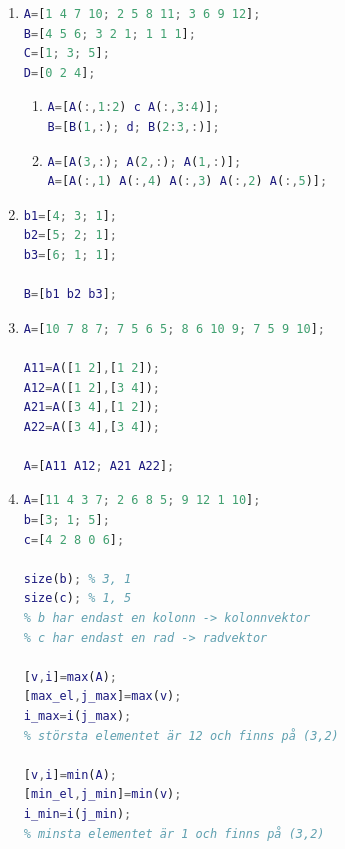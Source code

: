 \documentclass{article}
\begin{document}
\begin{enumerate}

\item
\begin{lstlisting}[language=matlab]
A=[1 4 7 10; 2 5 8 11; 3 6 9 12];
B=[4 5 6; 3 2 1; 1 1 1];
C=[1; 3; 5];
D=[0 2 4];
\end{lstlisting}

\begin{enumerate}

\item
\begin{lstlisting}[language=matlab]
A=[A(:,1:2) c A(:,3:4)];
B=[B(1,:); d; B(2:3,:)];
\end{lstlisting}

\item
\begin{lstlisting}[language=matlab]
A=[A(3,:); A(2,:); A(1,:)];
A=[A(:,1) A(:,4) A(:,3) A(:,2) A(:,5)];
\end{lstlisting}

\end{enumerate}

\item
\begin{lstlisting}[language=matlab]
b1=[4; 3; 1];
b2=[5; 2; 1];
b3=[6; 1; 1];

B=[b1 b2 b3];
\end{lstlisting}

\item
\begin{lstlisting}[language=matlab]
A=[10 7 8 7; 7 5 6 5; 8 6 10 9; 7 5 9 10];

A11=A([1 2],[1 2]);
A12=A([1 2],[3 4]);
A21=A([3 4],[1 2]);
A22=A([3 4],[3 4]);

A=[A11 A12; A21 A22];
\end{lstlisting}

\item
\begin{lstlisting}[language=matlab]
A=[11 4 3 7; 2 6 8 5; 9 12 1 10];
b=[3; 1; 5];
c=[4 2 8 0 6];

size(b); % 3, 1
size(c); % 1, 5
% b har endast en kolonn -> kolonnvektor
% c har endast en rad -> radvektor

[v,i]=max(A);
[max_el,j_max]=max(v);
i_max=i(j_max);
% största elementet är 12 och finns på (3,2)

[v,i]=min(A);
[min_el,j_min]=min(v);
i_min=i(j_min);
% minsta elementet är 1 och finns på (3,2)
\end{lstlisting}


\end{enumerate}
\end{document}

